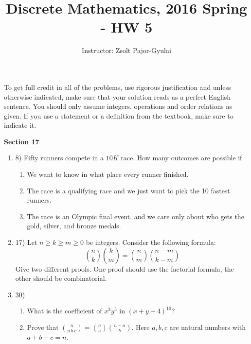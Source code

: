 \documentclass[11pt]{preprint}
\title{Discrete Mathematics, 2016 Spring - HW 5}
\author{Instructor: Zsolt Pajor-Gyulai}
\institute{Courant Institute of Mathematical Sciences, NYU}
\def\enumb{\begin{enumerate}}
\def\enume{\end{enumerate}}
\begin{document}
\maketitle

To get full credit  in all of the problems, use rigorous justification and unless otherwise indicated, make sure that your solution reads as a perfect English sentence. You should only assume integers, operations and order relations as given. If you use a statement or a definition from the textbook, make sure to indicate it.
\vspace{0.2cm}

\textbf{Section 17}
\enumb

\item[8)] Fifty runners compete in a $10K$ race. How many outcomes are possible if
\enumb
\item We want to know in what place every runner finished.
\item The race is a qualifying race and we just want to pick the 10 fastest runners.
\item The race is an Olympic final event, and we care only about who gets the gold, silver, and bronze medals.
\enume
\item[17)] Let $n\geq k\geq m\geq 0$ be integers. Consider the following formula:
\[
\binom{n}{k}\binom{k}{m}=\binom{n}{m}\binom{n-m}{k-m}
\]
Give two different proofs. One proof should use the factorial formula, the other should be combinatorial.
\item[30)] 
\enumb
\item What is the coefficient of $x^3y^5$ in $(x+y+4)^{10}$?
\item Prove that $\binom{n}{a~b~c}=\binom{n}{a}\binom{n-a}{b}$. Here $a,b,c$ are natural numbers with $a+b+c=n$.
\enume

\enume
\end{document}
